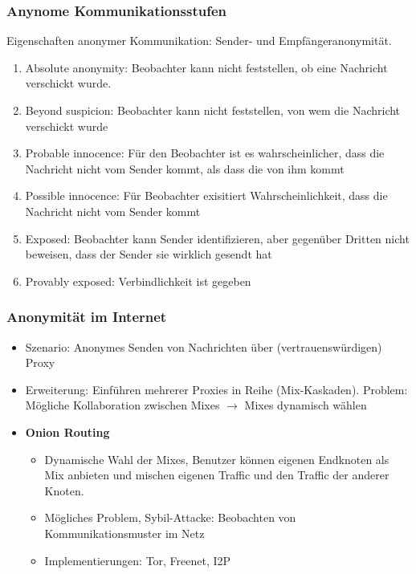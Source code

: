\subsubsection{Anynome Kommunikationsstufen}
Eigenschaften anonymer Kommunikation: Sender- und Empfängeranonymität.
\begin{enumerate}
	\item Absolute anonymity: Beobachter kann nicht feststellen, ob eine Nachricht verschickt wurde.
	\item Beyond suspicion: Beobachter kann nicht feststellen, von wem die Nachricht verschickt wurde
	\item Probable innocence: Für den Beobachter ist es wahrscheinlicher, dass die Nachricht nicht vom Sender kommt, als dass die von ihm kommt
	\item Possible innocence: Für Beobachter exisitiert Wahrscheinlichkeit, dass die Nachricht nicht vom Sender kommt
	\item Exposed: Beobachter kann Sender identifizieren, aber gegenüber Dritten nicht beweisen, dass der Sender sie wirklich gesendt hat
	\item Provably exposed: Verbindlichkeit ist gegeben
\end{enumerate}

\subsubsection{Anonymität im Internet}
\begin{itemize}
	\item Szenario: Anonymes Senden von Nachrichten über (vertrauenswürdigen) Proxy
	\item Erweiterung: Einführen mehrerer Proxies in Reihe (Mix-Kaskaden). Problem: Mögliche Kollaboration zwischen Mixes $\rightarrow$ Mixes dynamisch wählen
	\item \textbf{Onion Routing}
	\begin{itemize}
		\item Dynamische Wahl der Mixes, Benutzer können eigenen Endknoten als Mix anbieten und mischen eigenen Traffic und den Traffic der anderer Knoten.
		\item Mögliches Problem, Sybil-Attacke: Beobachten von Kommunikationsmuster im Netz
		\item Implementierungen: Tor, Freenet, I2P
	\end{itemize}
\end{itemize}



